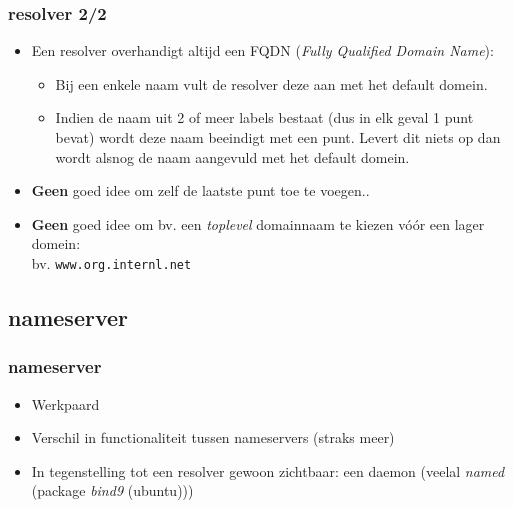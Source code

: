 \begin{styleframefrag}
	\frametitle{resolver 2/2}
\begin{itemize}
\item Een resolver overhandigt altijd een FQDN ({\it Fully Qualified Domain Name}):
	\begin{itemize}
	\item Bij een enkele naam vult de resolver deze aan met het default domein.
	\item Indien de naam uit 2 of meer labels bestaat (dus in elk geval 1 punt bevat) wordt deze naam beeindigt met een punt. Levert dit niets op dan wordt alsnog de naam aangevuld met het default domein.
	\end{itemize}
\pause
\item {\bf Geen} goed idee om zelf de laatste punt toe te voegen..
\pause
\item {\bf Geen} goed idee om bv. een {\it toplevel} domainnaam te kiezen v\'o\'or een lager domein:\\
bv. {\tt www.org.internl.net}
\end{itemize}
\end{styleframefrag}

\subsection{nameserver}
\begin{styleframe}
	\frametitle{nameserver}
\begin{itemize}
	\item Werkpaard
	\item Verschil in functionaliteit tussen nameservers (straks meer)
	\item In tegenstelling tot een resolver gewoon zichtbaar: een daemon (veelal {\it named} (package {\it bind9} (ubuntu)))
\end{itemize}
\end{styleframe}

